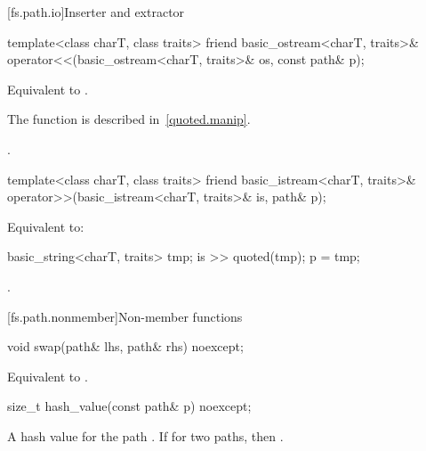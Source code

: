 [fs.path.io]{Inserter and extractor}

%
\begin{itemdecl}
template<class charT, class traits>
  friend basic_ostream<charT, traits>&
    operator<<(basic_ostream<charT, traits>& os, const path& p);
\end{itemdecl}

\begin{itemdescr}
\pnum
\effects
Equivalent to .
\begin{note}
The  function is described in~\ref{quoted.manip}.
\end{note}

\pnum
\returns
{}.
\end{itemdescr}

%
\begin{itemdecl}
template<class charT, class traits>
  friend basic_istream<charT, traits>&
    operator>>(basic_istream<charT, traits>& is, path& p);
\end{itemdecl}

\begin{itemdescr}
\pnum
\effects
Equivalent to:
\begin{codeblock}
basic_string<charT, traits> tmp;
is >> quoted(tmp);
p = tmp;
\end{codeblock}

\pnum
\returns
{}.
\end{itemdescr}

[fs.path.nonmember]{Non-member functions}

%
\begin{itemdecl}
void swap(path& lhs, path& rhs) noexcept;
\end{itemdecl}

\begin{itemdescr}
\pnum
\effects
Equivalent to .
\end{itemdescr}

%
\begin{itemdecl}
size_t hash_value(const path& p) noexcept;
\end{itemdecl}

\begin{itemdescr}
\pnum
\returns
A hash value for the path . If
  for two paths,  then .
\end{itemdescr}

